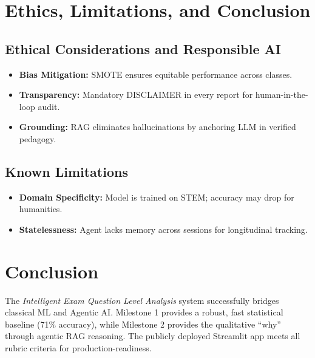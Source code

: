 \documentclass[12pt,a4paper]{article}
\begin{document}
\vspace{3cm}
\section{Ethics, Limitations, and Conclusion}

\subsection{Ethical Considerations and Responsible AI}

\begin{itemize}[leftmargin=2em]
  \item \textbf{Bias Mitigation:} SMOTE ensures equitable performance across classes.
  \item \textbf{Transparency:} Mandatory DISCLAIMER in every report for human-in-the-loop audit.
  \item \textbf{Grounding:} RAG eliminates hallucinations by anchoring LLM in verified pedagogy.
\end{itemize}

\subsection{Known Limitations}
\begin{itemize}[leftmargin=2em]
  \item \textbf{Domain Specificity:} Model is trained on STEM; accuracy may drop for humanities.
  \item \textbf{Statelessness:} Agent lacks memory across sessions for longitudinal tracking.
\end{itemize}

\section{Conclusion}

The \emph{Intelligent Exam Question Level Analysis} system successfully bridges classical ML
and Agentic AI. Milestone 1 provides a robust, fast statistical baseline (71\% accuracy),
while Milestone 2 provides the qualitative ``why'' through agentic RAG reasoning. 
The publicly deployed Streamlit app meets all rubric criteria for production-readiness.
\end{document}
